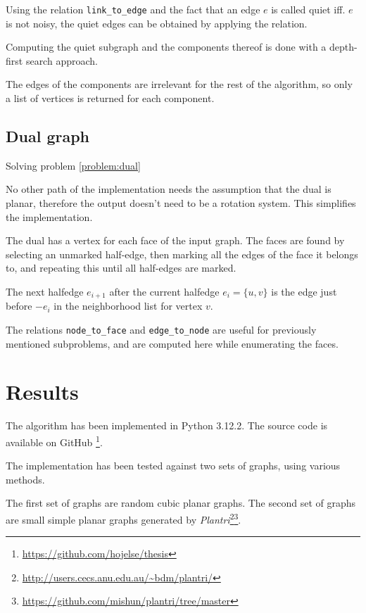 \documentclass{article}
\begin{document}
			Using the relation \texttt{link_to_edge} and the fact that an edge $e$ is called quiet iff. $e$ is not noisy, the quiet edges can be obtained by applying the relation.

			Computing the quiet subgraph and the components thereof is done with a depth-first search approach.

			The edges of the components are irrelevant for the rest of the algorithm, so only a list of vertices is returned for each component.


		\subsection{Dual graph}\label{impl:dual}

			Solving problem \ref{problem:dual}

			No other path of the implementation needs the assumption that the dual is planar, therefore the output doesn't need to be a rotation system. This simplifies the implementation.

			The dual has a vertex for each face of the input graph. The faces are found by selecting an unmarked half-edge, then marking all the edges of the face it belongs to, and repeating this until all half-edges are marked.

			The next halfedge $e_{i+1}$ after the current halfedge $e_i = \{u, v\}$ is the edge just before $-e_i$ in the neighborhood list for vertex $v$.
			
			The relations \texttt{node_to_face} and \texttt{edge_to_node} are useful for previously mentioned subproblems, and are computed here while enumerating the faces.


\section{Results}
	The algorithm has been implemented in Python 3.12.2. The source code is available on GitHub \footnote{\url{https://github.com/hojelse/thesis}}.

	The implementation has been tested against two sets of graphs, using various methods.

	The first set of graphs are random cubic planar graphs. The second set of graphs are small simple planar graphs generated by \textit{Plantri}\footnote{\url{http://users.cecs.anu.edu.au/~bdm/plantri/}}\footnote{\url{https://github.com/mishun/plantri/tree/master}}.\cite{BM}
\end{document}
